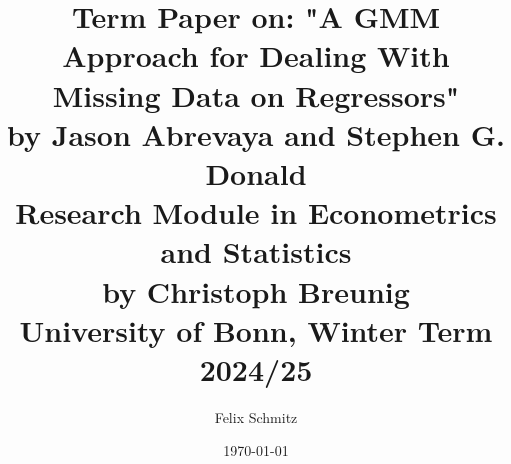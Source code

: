 \documentclass[11pt, a4paper, leqno]{article}
\begin{document}
\title{Term Paper on: "A GMM Approach for Dealing With Missing Data on Regressors" \\
by Jason Abrevaya and Stephen G. Donald \\
Research Module in Econometrics and Statistics \\
by Christoph Breunig \\
University of Bonn, Winter Term 2024/25}

\author{Felix Schmitz\footnotemark[1]}

\date{
    \today
}

\maketitle
{}

\clearpage









\clearpage

\printbibliography
\end{document}
